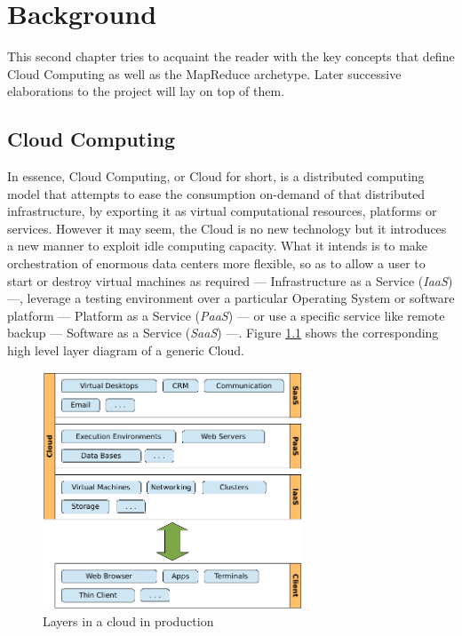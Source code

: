 \chapter{Background}\label{cap:estadodelarte}

\noindent This second chapter tries to acquaint the reader with the key concepts that define Cloud Computing as well as the MapReduce archetype. Later successive elaborations to the project will lay on top of them.


\section{Cloud Computing}\label{sec:computacioncloud}

\noindent In essence, Cloud Computing, or Cloud for short, is a distributed computing model that attempts to ease the consumption on-demand of that distributed infrastructure, by exporting it as virtual computational resources, platforms or services. However it may seem, the Cloud is no new technology but it introduces a new manner to exploit idle computing capacity. What it intends is to make orchestration of enormous data centers more flexible, so as to allow a user to start or destroy virtual machines as required --- Infrastructure as a Service (\emph{IaaS}) ---, leverage a testing environment over a particular Operating System or software platform --- Platform as a Service (\emph{PaaS}) --- or use a specific service like remote backup --- Software as a Service (\emph{SaaS}) ---. Figure \ref{fig:cloudlayers} shows the corresponding high level layer diagram of a generic Cloud.

\begin{figure}[tbp]
\begin{center}
\includegraphics[width=0.69\textwidth]{imagenes/003.pdf}
 \caption{Layers in a cloud in production}
\label{fig:cloudlayers}
\end{center}
\end{figure}

